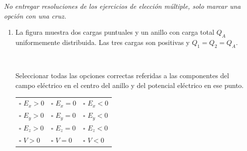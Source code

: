 \documentclass[a4paper,11pt,dvipsnames]{article}
\begin{document}


\textit{No entregar resoluciones de los ejercicios de elección múltiple, solo marcar una opción con una cruz.}

\begin{enumerate}[leftmargin=*]
\item
\begin{minipage}[t]{.4\textwidth}
La figura muestra dos cargas puntuales y un anillo con carga total $Q_A$ uniformemente distribuida. Las tres cargas son positivas y $Q_1 = Q_2 = Q_A$.
\begin{center}
\end{center}
\end{minipage}
\begin{minipage}[t]{.05\textwidth}
~    
\end{minipage}
\begin{minipage}[t]{.5\textwidth}
Seleccionar todas las opciones correctas referidas a las componentes del campo eléctrico en el centro del anillo y del potencial eléctrico en ese punto.\\
\begin{tabularx}{\textwidth}{XXX}
$\square$ $E_x > 0$ & $\square$ $E_x = 0$ & $\square$ $E_x < 0$ \\
$\square$ $E_y > 0$ & $\square$ $E_y = 0$ & $\square$ $E_y < 0$\\
$\square$ $E_z > 0$ & $\square$ $E_z = 0$ & $\square$ $E_z < 0$\\
$\square$ $V > 0$ & $\square$ $V = 0$ & $\square$ $V < 0$
\end{tabularx}
\end{minipage}



\end{enumerate}
\end{document}
